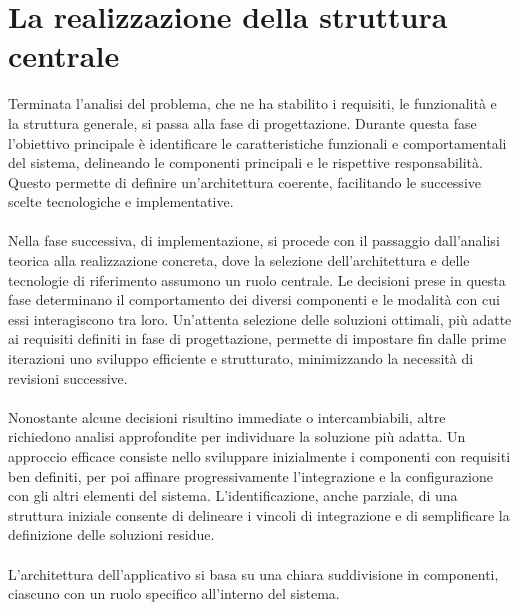 \chapter{La realizzazione della struttura centrale}

Terminata l'analisi del problema, che ne ha stabilito i requisiti, le funzionalità e la struttura generale,
si passa alla fase di progettazione.
Durante questa fase l'obiettivo principale è identificare le caratteristiche funzionali e comportamentali del sistema, 
delineando le componenti principali e le rispettive responsabilità.
Questo permette di definire un'architettura coerente, 
facilitando le successive scelte tecnologiche e implementative.\\
\\
Nella fase successiva, di implementazione, 
si procede con il passaggio dall’analisi teorica alla realizzazione concreta,
dove la selezione dell’architettura e delle tecnologie di riferimento assumono un ruolo centrale.
Le decisioni prese in questa fase determinano il comportamento dei diversi componenti e 
le modalità con cui essi interagiscono tra loro.
Un’attenta selezione delle soluzioni ottimali, più adatte ai requisiti definiti in fase di progettazione,
permette di impostare fin dalle prime iterazioni uno sviluppo efficiente e strutturato, 
minimizzando la necessità di revisioni successive.\\
\\
Nonostante alcune decisioni risultino immediate o intercambiabili, 
altre richiedono analisi approfondite per individuare la soluzione più adatta.
Un approccio efficace consiste nello sviluppare inizialmente i componenti con requisiti ben definiti,
per poi affinare progressivamente l'integrazione e la configurazione con gli altri elementi del sistema.
L'identificazione, anche parziale, di una struttura iniziale consente di delineare i vincoli di integrazione e 
di semplificare la definizione delle soluzioni residue.\\
\\
L’architettura dell’applicativo si basa su una chiara suddivisione in componenti, 
ciascuno con un ruolo specifico all’interno del sistema.
\\

